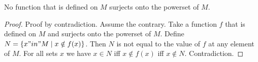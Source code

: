 \documentclass{article}
\begin{document}
\begin{forthel}
    \begin{theorem}[Cantor]
      No function that is defined on $M$ surjects onto the powerset of $M$.
    \end{theorem}
    \begin{proof}
      Proof by contradiction. Assume the contrary.
      Take a function $f$ that is defined on $M$ and surjects onto the powerset of $M$.
      Define $N = \{ x "in" M \mid x \notin f(x) \}$.
      Then $N$ is not equal to the value of $f$ at any element of $M$.
      For all sets $x$ we have $x\in N$ iff $x\notin f(x)$ iff $x\notin N$.
      Contradiction.
    \end{proof}

  \end{forthel}
\end{document}
